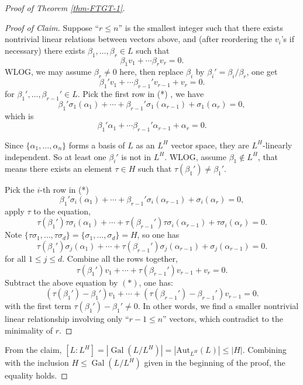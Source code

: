 \documentclass[11pt]{book}
\begin{document}
\begin{proof}[Proof of Theorem \ref{thm-FTGT-1}]
\begin{proof}[Proof of Claim]
        Suppose ``$r\leq n$'' is the smallest integer such that there exists nontrivial linear relations between vectors above, and (after reordering the $v_i$'s if necessary) there exists $\beta_1, \dots, \beta_r \in L$ such that
        \[
        \beta_{1}v_{1}+\cdots \beta_{r}v_{r}=0. 
        \]
        WLOG, we may assume $\beta_{r}\neq 0$ here, then replace $\beta_{i}$ by $\beta_{i}'=\beta_{i}/ \beta_{r}$, one get 
        \[
        \beta_{1}'v_{1}+\cdots \beta_{r-1}'v_{r-1}+v_{r}=0. \tag*{(*)}
        \]
        for $\beta_1', \dots, \beta_{r-1}' \in L$. Pick the first row in (*) , we have 
        \[
        \beta_{1}'\sigma_{1}(\alpha_{1})+\cdots +\beta_{r-1}'\sigma_{1}(\alpha_{r-1})+\sigma_{1}(\alpha_{r})=0,
        \]
        which is 
        \[
        \beta_{1}'\alpha_{1}+\cdots \beta_{r-1}'\alpha_{r-1}+\alpha_{r}=0. 
        \]
        
        Since $\{\alpha_{1},\dots, \alpha_{n}\}$ forms a basis of $L$ as an $L^{H}$ vector space, they are $L^{H}$-linearly independent. So at least one $\beta_{i}'$ is not in $L^{H}$. WLOG, assume $\beta_{1}\notin L^{H}$, that means there exists an element $\tau\in H$ such that $\tau(\beta_{1}') \neq \beta_{1}'$. 

        Pick the $i$-th row in (*)
        \[
        \beta_{1}'\sigma_{i}(\alpha_{1})+\cdots +\beta_{r-1}'\sigma_{i}(\alpha_{r-1})+\sigma_{i}(\alpha_{r})=0,
        \]
        apply $\tau$ to the equation, 
        \[
        \tau(\beta_{1}')\tau\sigma_{i}(\alpha_{1})+\cdots+\tau(\beta_{r-1}')\tau\sigma_{i}(\alpha_{r-1})+\tau\sigma_{i}(\alpha_{r})=0. 
        \]
        Note $\{\tau\sigma_{1}, \dots, \tau\sigma_{d}\} = \{\sigma_{1}, \dots, \sigma_{d}\} = H$, so one has
        \[
        \tau(\beta_{1}')\sigma_{j}(\alpha_{1})+\cdots+\tau(\beta_{r-1}')\sigma_{j}(\alpha_{r-1})+\sigma_{j}(\alpha_{r-1})=0.
        \]
        for all $1 \leq j \leq d$. Combine all the rows together, 
        \[
        \tau(\beta_{1}')v_{1}+\cdots+\tau(\beta_{r-1}')v_{r-1}+v_{r}=0.
        \]
    Subtract the above equation by $(*)$, one has:
        \[(\tau(\beta_{1}')-\beta_{1}')v_{1}+\cdots+(\tau(\beta_{r-1}')-\beta_{r-1}')v_{r-1}=0. \]
        with the first term $\tau(\beta_{1}')-\beta_{1}' \neq 0$. In other words, we find a smaller nontrivial linear relationship involving only ``$r-1\leq n$'' vectors, which contradict to the minimality of $r$. 
    \end{proof}

    From the claim, $[L:L^{H}]=\left| \operatorname{Gal}(L /L^{H}) \right| = |\mathrm{Aut}_{L^H}(L)| \leq \left| H \right| $. Combining with the inclusion $H\leq \operatorname{Gal}(L /L^{H})$ given in the beginning of the proof, the equality holds. 
\end{proof}
\end{document}
